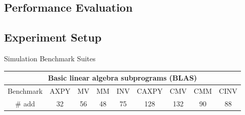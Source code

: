 \documentclass{beamer}
\begin{document}
\begin{CJK}{UTF8}{bkai}
            \section{Performance Evaluation}
            \subsection{Experiment Setup}
            \begin{frame}{Simulation Benchmark Suites}
                \begin{table}[!ht]
                    \centering
                    \resizebox{\columnwidth}{!}
                    {
                        \begin{tabular}{|c|c|c|c|c|c|c|c|c|}
                            \hline
                            \multicolumn{9}{|c|}{\textbf{Basic linear algebra subprograms (BLAS)}} \\ \hline
                            Benchmark              & AXPY   & MV     & MM      & INV      & CAXPY  & CMV  & CMM    & CINV  \\ \hline
                            \# add            &  32    &  56    &   48    &    75    &  128   & 132  &   90   &  88   \\ \hline

\end{tabular}}
\end{table}
\end{frame}
\end{CJK}
\end{document}
